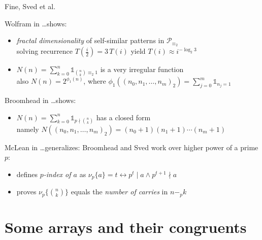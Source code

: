 \documentclass[10pt,serif, professionalfont]{beamer}
\begin{document}
\begin{frame}{Fine, Sved et al.}
    \begin{block}{Wolfram in \ldots shows:}
        \begin{itemize}
            \item {\normalsize \emph{fractal dimensionality} of self-similar patterns in $\mathcal{P}_{\equiv_{2}}$}\\
                \footnotesize{solving recurrence $T(\frac{i}{2})=3\,T(i)$ yield $T(i)\approx i^{-\log_{2}{3}}$}
            \item {\normalsize $N(n)=\sum_{k=0}^{n}{\mathbb{1}_{{{n}\choose{k}}\equiv_{2}1}}$ is a very irregular function }\\
                \footnotesize{also $N(n)=2^{\phi_{1}(n)}$, where $ \phi_{1}((n_{0},n_{1},\ldots,n_{m})_{2})=
                    \sum_{j=0}^{m}{\mathbb{1}_{n_{j}=1} }$}
        \end{itemize}
    \end{block}
    \pause
    \begin{block}{Broomhead in \ldots shows:}
        \begin{itemize}
            \item {\normalsize $N(n)=\sum_{k=0}^{n}{\mathbb{1}_{p\nmid{{n}\choose{k}}}}$ has a closed form }\\
                \footnotesize{namely $N((n_{0},n_{1},\ldots,n_{m})_{2})=(n_{0}+1)(n_{1}+1)\cdots(n_{m}+1)$}
        \end{itemize}
    \end{block}
    \pause
    \begin{block}{McLean in \ldots generalizes:}
        Broomhead and Sved work over higher power of a prime $p$:
        \begin{itemize}
            \item defines \emph{$p$-index of $a$} as {$\nu_{p}\lbrace a\rbrace =t \leftrightarrow p^{t}\mid a \wedge p^{t+1}\nmid a$}
            \item proves {$\nu_{p}\lbrace {{n}\choose{k}}\rbrace $} equals the \emph{number of carries} in $n-_{p}k$
        \end{itemize}
    \end{block}
\end{frame}

\section{Some arrays and their congruents}
\end{document}
